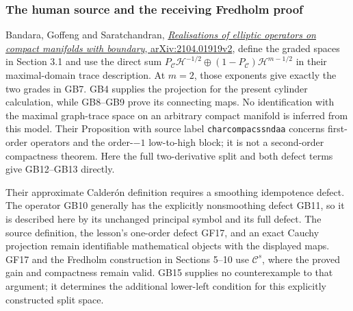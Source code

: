 \documentclass[
  11pt,
]{article}
\begin{document}
\subsubsection{The human source and the receiving Fredholm
proof}\label{the-human-source-and-the-receiving-fredholm-proof}

Bandara, Goffeng and Saratchandran,
\href{https://arxiv.org/abs/2104.01919v2}{\emph{Realisations of elliptic
operators on compact manifolds with boundary}, arXiv:2104.01919v2},
define the graded spaces in Section 3.1 and use the direct sum
\(P_{\mathcal C}\mathscr H^{-1/2}\oplus(1-P_{\mathcal C})\mathscr H^{m-1/2}\)
in their maximal-domain trace description. At \(m=2\), those exponents
give exactly the two grades in GB7. GB4 supplies the projection for the
present cylinder calculation, while GB8--GB9 prove its connecting maps.
No identification with the maximal graph-trace space on an arbitrary
compact manifold is inferred from this model. Their Proposition with
source label \texttt{charcompacssndaa} concerns first-order operators
and the order-\(-1\) low-to-high block; it is not a second-order
compactness theorem. Here the full two-derivative split and both defect
terms give GB12--GB13 directly.

Their approximate Calderón definition requires a smoothing idempotence
defect. The operator GB10 generally has the explicitly nonsmoothing
defect GB11, so it is described here by its unchanged principal symbol
and its full defect. The source definition, the lesson's one-order
defect GF17, and an exact Cauchy projection remain identifiable
mathematical objects with the displayed maps. GF17 and the Fredholm
construction in Sections 5--10 use \(\mathcal C^s\), where the proved
gain and compactness remain valid. GB15 supplies no counterexample to
that argument; it determines the additional lower-left condition for
this explicitly constructed split space.
\end{document}
